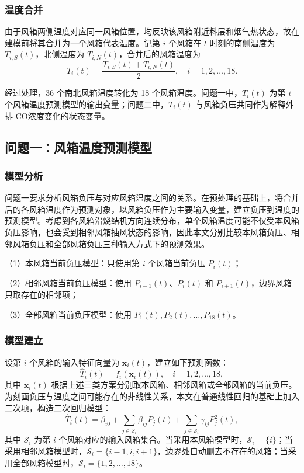 \documentclass[UTF8,a4paper,zihao=-4]{ctexart}
\newcommand{\CO}{CO}
\begin{document}
\subsubsection{温度合并}

由于风箱两侧温度对应同一风箱位置，均反映该风箱附近料层和烟气热状态，故在建模前将其合并为一个风箱代表温度。记第 $i$ 个风箱在 $t$ 时刻的南侧温度为 $T_{i,S}(t)$，北侧温度为 $T_{i,N}(t)$，合并后的风箱温度为
\begin{equation}
T_i(t)=\frac{T_{i,S}(t)+T_{i,N}(t)}{2},\quad i=1,2,\ldots,18.
\end{equation}

经过处理，36 个南北风箱温度转化为 18 个风箱温度。问题一中，$T_i(t)$ 为第 $i$ 个风箱温度预测模型的输出变量；问题二中，$T_i(t)$ 与风箱负压共同作为解释外排 \CO 浓度变化的状态变量。

\subsection{问题一：风箱温度预测模型}

\subsubsection{模型分析}

问题一要求分析风箱负压与对应风箱温度之间的关系。在预处理的基础上，将合并后的各风箱温度作为预测对象，以风箱负压作为主要输入变量，建立负压到温度的预测模型。考虑到各风箱沿烧结机方向连续分布，单个风箱温度可能不仅受本风箱负压影响，也会受到相邻风箱抽风状态的影响，因此本文分别比较本风箱负压、相邻风箱负压和全部风箱负压三种输入方式下的预测效果。

（1）本风箱当前负压模型：只使用第 $i$ 个风箱当前负压 $P_i(t)$；

（2）相邻风箱当前负压模型：使用 $P_{i-1}(t)$、$P_i(t)$ 和 $P_{i+1}(t)$，边界风箱只取存在的相邻项；

（3）全部风箱当前负压模型：使用 $P_1(t),P_2(t),\ldots,P_{18}(t)$。

\subsubsection{模型建立}

设第 $i$ 个风箱的输入特征向量为 $\mathbf x_i(t)$，建立如下预测函数：
\begin{equation}
\hat T_i(t)=f_i\left(\mathbf x_i(t)\right),\quad i=1,2,\ldots,18,
\end{equation}
其中 $\mathbf x_i(t)$ 根据上述三类方案分别取本风箱、相邻风箱或全部风箱的当前负压。为刻画负压与温度之间可能存在的非线性关系，本文在普通线性回归的基础上加入二次项，构造二次回归模型：
\begin{equation}
\hat T_i(t)=\beta_{i0}+\sum_{j\in \mathcal S_i}\beta_{ij}P_j(t)
+\sum_{j\in \mathcal S_i}\gamma_{ij}P_j^2(t),
\end{equation}
其中 $\mathcal S_i$ 为第 $i$ 个风箱对应的输入风箱集合。当采用本风箱模型时，$\mathcal S_i=\{i\}$；当采用相邻风箱模型时，$\mathcal S_i=\{i-1,i,i+1\}$，边界处自动删去不存在的风箱；当采用全部风箱模型时，$\mathcal S_i=\{1,2,\ldots,18\}$。
\end{document}
